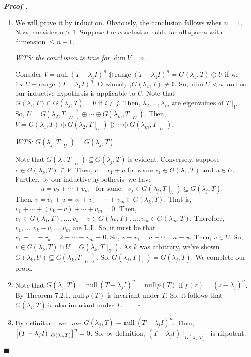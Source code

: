 \documentclass[11pt, letterpaper]{article}
\newcounter{nprf}[subsection]
\newenvironment*{prf}{\par\indent\textbf{\textit{Proof \stepcounter{nprf}\thenprf.}}}{\hfill$\blacksquare$\par}
\def\LI{\mathrm{L.I.}}
\def\pqde{\qquad\square}
\def\Null{\mathrm{null\ }}
\def\range{\mathrm{range\ }}
\begin{document}
\begin{prf}
	\begin{enumerate}
		\item We will prove it by induction. Obviously, the conclusion follows when $n=1$. Now, consider $n>1$. Suppose the conclusion holds for all spaces with dimension $\leq n-1$.\par 
		\textit{WTS: the conclusion is true for $\dim V=n$}.\par Consider $V=\Null(T-\lambda_1I)^n\oplus\range(T-\lambda_1I)^n=G(\lambda_1,T)\oplus U$ if we fix $U=\range(T-\lambda_1I)^n$. Obviously ,$G(\lambda_1,T)\neq\qty{0}$. So, $\dim U<n$, and so our inductive hypothesis is applicable to $U$. Note that $G(\lambda_i,T)\cap G(\lambda_j, T)=\qty{0}$ if $i\neq j$. Then, $\lambda_2,\dots,\lambda_m$ are eigenvalues of $T\mid_U$. So, $U=G(\lambda_2,T\mid_U)\oplus\cdots\oplus G(\lambda_m,T\mid_U)$. Then, $V=G(\lambda_1,T)\oplus G(\lambda_2,T\mid_U)\oplus\cdots\oplus G(\lambda_m,T\mid_U)$.\par 
		\textit{WTS: $G(\lambda_j, T\mid_U)=G(\lambda_j,T)$}\par Note that $G(\lambda_j,T\mid_U)\subseteq G(\lambda_j,T)$ is evident. Conversely, suppose $v\in G(\lambda_k,T)\subseteq V$. Then, $v=v_1+u$ for some $v_1\in G(\lambda_1,T)$ and $u\in U$. Further, by our inductive hypothesis, we have \[u=v_2+\cdots+v_m\quad\text{for some}\quad v_j\in G(\lambda_j,T\mid_U)\subseteq G(\lambda_j,T).\] Then, $v=v_1+u=v_1+v_2+\cdots+v_m\in G(\lambda_k,T)$. That is, $v_1+\cdots+(v_k-v)+\cdots+v_m=0$. Then, $v_1\in G(\lambda_1,T),\dots,v_k-v\in G(\lambda_k,T),\dots,v_m\in G(\lambda_m,T)$. Therefore, $v_1,\dots,v_k-v,\dots,v_m$ are $\LI$. So, it must be that $v_1=\cdots=v_k-2=\cdots=v_m=0$. So, $v=v_1+u=0+u=u$. Then, $v\in U$. So, $v\in G(\lambda_k,T)\cap U=G(\lambda_k,T\mid_U)$. As $k$ was arbitrary, we've shown $G(\lambda_k,U)\subseteq G(\lambda_k,T\mid_U)$. So, $G(\lambda_j,T\mid_U)=G(\lambda_j,T)$. We complete our proof. 
		\item Note that $G(\lambda_j,T)=\Null(T-\lambda_jI)^n=\Null p(T)$ if $p(z)=(z-\lambda_j)^n$. By Theorem 7.2.1, $\Null p(T)$ is invariant under $T$. So, it follows that $G(\lambda_j, T)$ is also invariant under $T$. $\pqde$
		\item By definition, we have $G(\lambda_j,T)=\Null(T-\lambda_jI)^n$. Then, $\qty[(T-\lambda_jI)\mid_{G(\lambda_j,T)}]^n=0$. So, by definition, $(T-\lambda_jI)\mid_{G(\lambda_j,T)}$ is nilpotent.
	\end{enumerate}	
\end{prf}
\end{document}
